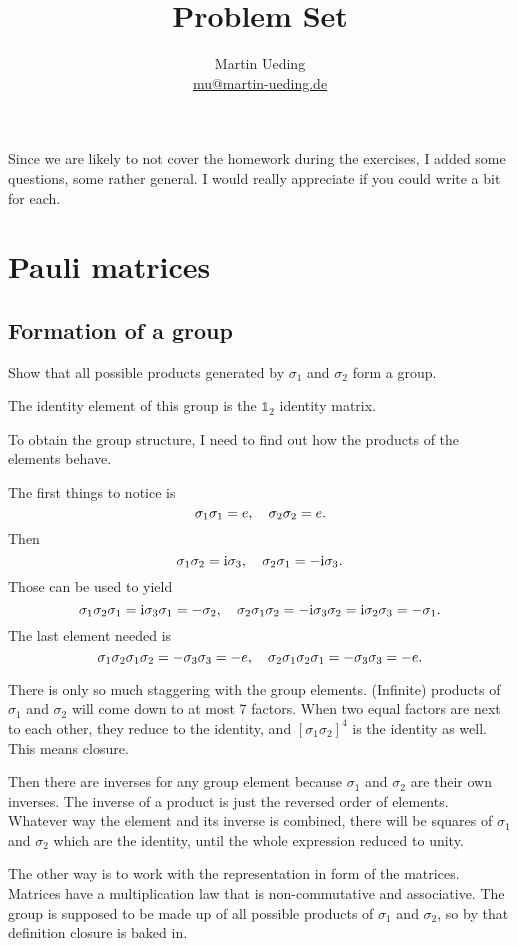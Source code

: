 \documentclass[11pt, english, fleqn, DIV=15, headinclude, BCOR=1cm]{scrartcl}
\title{Problem Set \arabic{problemset}}
\author{
    Martin Ueding \\ \small{\href{mailto:mu@martin-ueding.de}{mu@martin-ueding.de}}
}
\begin{document}
\maketitle

Since we are likely to not cover the homework during the exercises, I added
some questions, some rather general. I would really appreciate if you could
write a bit for each.

\section{Pauli matrices}

\newcommand\1{\sigma_1}
\newcommand\2{\sigma_2}
\newcommand\3{\sigma_3}
\newcommand\ssep{,\;}

\subsection{Formation of a group}

\begin{problem}
    Show that all possible products generated by $\1$ and $\2$ form a group.
\end{problem}

The identity element of this group is the $\mathbb 1_2$ identity matrix.

To obtain the group structure, I need to find out how the products of the
elements behave.

The first things to notice is
\[
    \1\1 = e
    \eqnsep
    \2\2 = e.
\]
Then
\[
    \1\2 = \iup \3
    \eqnsep
    \2\1 = - \iup \3.
\]
Those can be used to yield
\[
    \1\2\1 = \iup \3 \1 = - \2
    \eqnsep
    \2\1\2 = - \iup \3 \2 = \iup \2\3 = - \1.
\]
The last element needed is
\[
    \1\2\1\2 = - \3\3 = - e
    \eqnsep
    \2\1\2\1 = - \3\3 = - e.
\]

There is only so much staggering with the group elements. (Infinite) products
of $\1$ and $\2$ will come down to at most 7 factors. When two equal factors
are next to each other, they reduce to the identity, and $[\1\2]^4$ is the
identity as well. This means closure.

Then there are inverses for any group element because $\1$ and $\2$ are their
own inverses. The inverse of a product is just the reversed order of elements.
Whatever way the element and its inverse is combined, there will be squares of
$\1$ and $\2$ which are the identity, until the whole expression reduced to
unity.

The other way is to work with the representation in form of the matrices.
Matrices have a multiplication law that is non-commutative and associative. The
group is supposed to be made up of all possible products of $\1$ and $\2$, so
by that definition closure is baked in.
\end{document}
